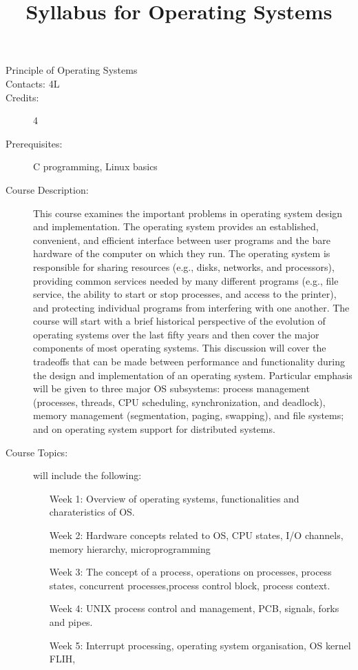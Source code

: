 \documentclass{wx672article} %
\title{Syllabus for Operating Systems}
\author{}\date{}
\begin{document}

\begin{description}
\item[Principle of Operating Systems]
\item[Contacts: 4L]
\item[Credits:] 4
\item[Prerequisites:] C programming, Linux basics
\item[Course Description:] This course examines the important problems in operating system
  design and implementation. The operating system provides an established, convenient, and
  efficient interface between user programs and the bare hardware of the computer on which
  they run. The operating system is responsible for sharing resources (e.g., disks,
  networks, and processors), providing common services needed by many different programs
  (e.g., file service, the ability to start or stop processes, and access to the printer),
  and protecting individual programs from interfering with one another. The course will
  start with a brief historical perspective of the evolution of operating systems over the
  last fifty years and then cover the major components of most operating systems. This
  discussion will cover the tradeoffs that can be made between performance and
  functionality during the design and implementation of an operating system. Particular
  emphasis will be given to three major OS subsystems: process management (processes,
  threads, CPU scheduling, synchronization, and deadlock), memory management
  (segmentation, paging, swapping), and file systems; and on operating system support for
  distributed systems.
\item[Course Topics:] will include the following:
  \begin{itemize}
  \item[Week 1:] Overview of operating systems, functionalities and charateristics of OS.
  \item[Week 2:] Hardware concepts related to OS, CPU states, I/O channels, memory
    hierarchy, microprogramming
  \item[Week 3:] The concept of a process, operations on processes, process states,
    concurrent processes,process control block, process context.
  \item[Week 4:] UNIX process control and management, PCB, signals, forks and pipes.
  \item[Week 5:] Interrupt processing, operating system organisation, OS kernel FLIH,

\end{itemize}
\end{description}
\end{document}
